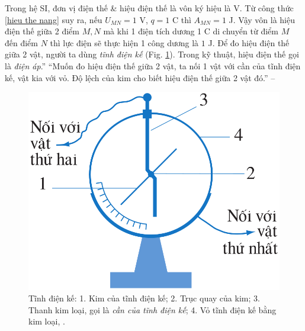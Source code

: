 \documentclass[oneside]{book}
\numberwithin{equation}{section}
\begin{document}
Trong hệ SI, đơn vị điện thế \& hiệu điện thế là vôn ký hiệu là V. Từ công thức \eqref{hieu the nang} suy ra, nếu $U_{MN} = 1$ V, $q = 1$ C thì $A_{MN} = 1$ J. Vậy vôn là hiệu điện thế giữa 2 điểm $M,N$ mà khi 1 điện tích dương 1 C di chuyển từ điểm $M$ đến điểm $N$ thì lực điện sẽ thực hiện 1 công dương là $1$ J. Để đo hiệu điện thế giữa 2 vật, người ta dùng \textit{tĩnh điện kế} (Fig. \ref{fig:tinh_dien_ke}). Trong kỹ thuật, hiệu điện thế gọi là \textit{điện áp}.'' ``Muốn đo hiệu điện thế giữa 2 vật, ta nối 1 vật với cần của tĩnh điện kế, vật kia với vỏ. Độ lệch của kim cho biết hiệu điện thế giữa 2 vật đó.'' -- \cite[p. 21]{SGK_Vat_Ly_11_nang_cao}

\begin{figure}[H]
	\centering
	\includegraphics[scale=0.15]{tinh_dien_ke}
	\caption{Tĩnh điện kế: 1. Kim của tĩnh điện kế; 2. Trục quay của kim; 3. Thanh kim loại, gọi là \textit{cần của tĩnh điện kế}; 4. Vỏ tĩnh điện kế bằng kim loại, \cite[Hình 4.2, p. 21]{SGK_Vat_Ly_11_nang_cao}.}
	\label{fig:tinh_dien_ke}
\end{figure}
\end{document}
